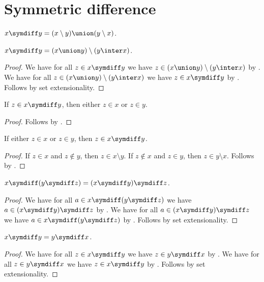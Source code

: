 \section{Symmetric difference}



\begin{definition}\label{symdiff}
    $x\symdiff y = (x\setminus y)\union (y\setminus x)$.
\end{definition}

\begin{proposition}%
\label{symdiff_as_setdiff}
    $x\symdiff y = (x\union y)\setminus (y\inter x)$.
\end{proposition}
\begin{proof}
    We have for all $z\in x\symdiff y$
        we have $z\in (x\union y)\setminus (y\inter x)$
        by .
    We have for all $z\in (x\union y)\setminus (y\inter x)$
        we have $z\in x\symdiff y$
        by .
    Follows by set extensionality.
\end{proof}

\begin{proposition}%
\label{symdiff_implies_xor_in}
    If $z\in x\symdiff y$, then either $z\in x$ or $z\in y$.
\end{proposition}
\begin{proof}
    Follows by .
\end{proof}

\begin{proposition}%
\label{xor_in_implies_symdiff}
    If either $z\in x$ or $z\in y$, then $z\in x\symdiff y$.
\end{proposition}
\begin{proof}
    If $z\in x$ and $z\not\in y$, then $z\in x\setminus y$.
    If $z\not\in x$ and $z\in y$, then $z\in y\setminus x$.
    Follows by .
\end{proof}

\begin{proposition}%
\label{symdiff_assoc}
    $x\symdiff (y\symdiff z) = (x\symdiff y)\symdiff z$.
\end{proposition}
\begin{proof}
    We have for all $a\in x\symdiff (y\symdiff z)$
        we have $a\in (x\symdiff y)\symdiff z$
        by .
    We have for all $a\in (x\symdiff y)\symdiff z$
        we have $a\in x\symdiff (y\symdiff z)$
        by .
    Follows by set extensionality.
\end{proof}

\begin{proposition}%
\label{symdiff_comm}
    $x\symdiff y = y\symdiff x$.
\end{proposition}
\begin{proof}
    We have for all $z\in x\symdiff y$
        we have $z\in y\symdiff x$
        by .
    We have for all $z\in y\symdiff x$
        we have $z\in x\symdiff y$
        by .
    Follows by set extensionality.
\end{proof}
